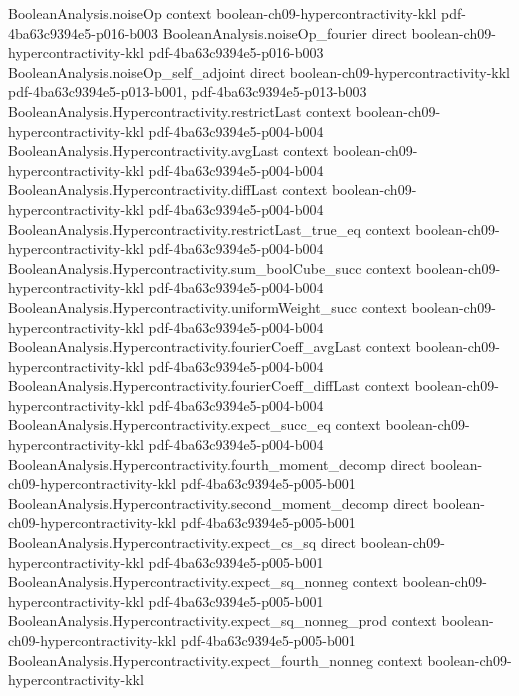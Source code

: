 \begin{theorem}[The $(4/3,2)$-hypercontractive inequality at $\rho=1/\sqrt3$]
\proofstep
  {BooleanAnalysis.noiseOp}
  {context}
  {boolean-ch09-hypercontractivity-kkl}
  {pdf-4ba63c9394e5-p016-b003}
\proofstep
  {BooleanAnalysis.noiseOp_fourier}
  {direct}
  {boolean-ch09-hypercontractivity-kkl}
  {pdf-4ba63c9394e5-p016-b003}
\proofstep
  {BooleanAnalysis.noiseOp_self_adjoint}
  {direct}
  {boolean-ch09-hypercontractivity-kkl}
  {pdf-4ba63c9394e5-p013-b001,
    pdf-4ba63c9394e5-p013-b003}
\proofstep
  {BooleanAnalysis.Hypercontractivity.restrictLast}
  {context}
  {boolean-ch09-hypercontractivity-kkl}
  {pdf-4ba63c9394e5-p004-b004}
\proofstep
  {BooleanAnalysis.Hypercontractivity.avgLast}
  {context}
  {boolean-ch09-hypercontractivity-kkl}
  {pdf-4ba63c9394e5-p004-b004}
\proofstep
  {BooleanAnalysis.Hypercontractivity.diffLast}
  {context}
  {boolean-ch09-hypercontractivity-kkl}
  {pdf-4ba63c9394e5-p004-b004}
\proofstep
  {BooleanAnalysis.Hypercontractivity.restrictLast_true_eq}
  {context}
  {boolean-ch09-hypercontractivity-kkl}
  {pdf-4ba63c9394e5-p004-b004}
\proofstep
  {BooleanAnalysis.Hypercontractivity.sum_boolCube_succ}
  {context}
  {boolean-ch09-hypercontractivity-kkl}
  {pdf-4ba63c9394e5-p004-b004}
\proofstep
  {BooleanAnalysis.Hypercontractivity.uniformWeight_succ}
  {context}
  {boolean-ch09-hypercontractivity-kkl}
  {pdf-4ba63c9394e5-p004-b004}
\proofstep
  {BooleanAnalysis.Hypercontractivity.fourierCoeff_avgLast}
  {context}
  {boolean-ch09-hypercontractivity-kkl}
  {pdf-4ba63c9394e5-p004-b004}
\proofstep
  {BooleanAnalysis.Hypercontractivity.fourierCoeff_diffLast}
  {context}
  {boolean-ch09-hypercontractivity-kkl}
  {pdf-4ba63c9394e5-p004-b004}
\proofstep
  {BooleanAnalysis.Hypercontractivity.expect_succ_eq}
  {context}
  {boolean-ch09-hypercontractivity-kkl}
  {pdf-4ba63c9394e5-p004-b004}
\proofstep
  {BooleanAnalysis.Hypercontractivity.fourth_moment_decomp}
  {direct}
  {boolean-ch09-hypercontractivity-kkl}
  {pdf-4ba63c9394e5-p005-b001}
\proofstep
  {BooleanAnalysis.Hypercontractivity.second_moment_decomp}
  {direct}
  {boolean-ch09-hypercontractivity-kkl}
  {pdf-4ba63c9394e5-p005-b001}
\proofstep
  {BooleanAnalysis.Hypercontractivity.expect_cs_sq}
  {direct}
  {boolean-ch09-hypercontractivity-kkl}
  {pdf-4ba63c9394e5-p005-b001}
\proofstep
  {BooleanAnalysis.Hypercontractivity.expect_sq_nonneg}
  {context}
  {boolean-ch09-hypercontractivity-kkl}
  {pdf-4ba63c9394e5-p005-b001}
\proofstep
  {BooleanAnalysis.Hypercontractivity.expect_sq_nonneg_prod}
  {context}
  {boolean-ch09-hypercontractivity-kkl}
  {pdf-4ba63c9394e5-p005-b001}
\proofstep
  {BooleanAnalysis.Hypercontractivity.expect_fourth_nonneg}
  {context}
  {boolean-ch09-hypercontractivity-kkl}

\end{theorem}
